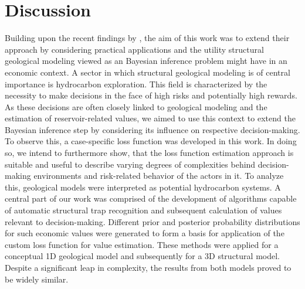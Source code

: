 	\chapter{Discussion}\label{cha:discussion}
	Building upon the recent findings by \citet{delaVarga2016}, the aim of this work was to extend their approach by considering practical applications and the utility structural geological modeling viewed as an Bayesian inference problem might have in an economic context. A sector in which structural geological modeling is of central importance is hydrocarbon exploration. This field is characterized by the necessity to make decisions in the face of high risks and potentially high rewards. As these decisions are often closely linked to geological modeling and the estimation of reservoir-related values, we aimed to use this context to extend the Bayesian inference step by considering its influence on respective decision-making. To observe this, a case-specific loss function was developed in this work. In doing so, we intend to furthermore show, that the loss function estimation approach is suitable and useful to describe varying degrees of complexities behind decision-making environments and risk-related behavior of the actors in it.
	To analyze this, geological models were interpreted as potential hydrocarbon systems. A central part of our work was comprised of the development of algorithms capable of automatic structural trap recognition and subsequent calculation of values relevant to decision-making. Different prior and posterior probability distributions for such economic values were generated to form a basis for application of the custom loss function for value estimation. These methods were applied for a conceptual 1D geological model and subsequently for a 3D structural model. 
	Despite a significant leap in complexity, the results from both models proved to be widely similar.
